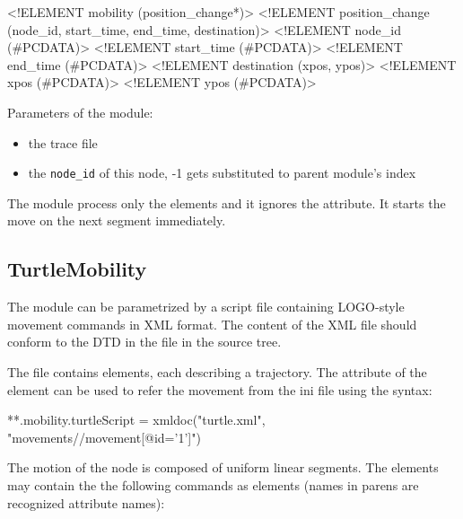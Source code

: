 \begin{description}
\begin{XML}
<!ELEMENT mobility (position_change*)>
<!ELEMENT position_change (node_id, start_time, end_time, destination)>
<!ELEMENT node_id (#PCDATA)>
<!ELEMENT start_time (#PCDATA)>
<!ELEMENT end_time (#PCDATA)>
<!ELEMENT destination (xpos, ypos)>
<!ELEMENT xpos (#PCDATA)>
<!ELEMENT ypos (#PCDATA)>
\end{XML}

Parameters of the module:

\begin{itemize}
  \item {} the trace file
  \item {} the \verb!node_id! of this node, -1 gets substituted to
  parent module's index
\end{itemize}

\begin{note}
The  module process only the 
elements and it ignores the  attribute. It starts the move
on the next segment immediately.
\end{note}


\end{description}


\subsection{TurtleMobility}
\label{sec:mobility:turtlemobility}

The  module can be parametrized by a script file
containing LOGO-style movement commands in XML format. The content of
the XML file should conform to the DTD in the 
file in the source tree.

The file contains  elements, each describing a trajectory.
The  attribute of the  element can be used to
refer the movement from the ini file using the syntax:

\begin{inifile}
**.mobility.turtleScript = xmldoc("turtle.xml", "movements//movement[@id='1']")
\end{inifile}

The motion of the node is composed of uniform linear segments.
The  elements may contain the the following commands as
elements (names in parens are recognized attribute names):

